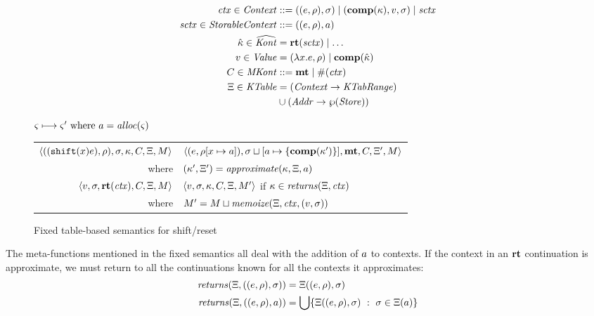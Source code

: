 \begin{align*}
  \mathit{ctx} \in \mathit{Context} &::= ((e,\rho),\sigma) \mid (\mathbf{comp}(\kappa),v,\sigma) \mid \mathit{sctx} \\
  \mathit{sctx} \in \mathit{StorableContext} &::= ((e,\rho),a) \\
  \hat{\kappa} \in \widehat{\mathit{Kont}} &= \mathbf{rt}(\mathit{sctx}) \mid \ldots \\
  v \in \mathit{Value} &= (\lambda{} x. e, \rho) \mid \mathbf{comp}(\hat{\kappa}) \\
  C \in \mathit{MKont} &::= \mathbf{mt} \mid \#(\mathit{ctx}) \\
  \Xi \in \mathit{KTable} &= (\mathit{Context} \to \mathit{KTabRange}) \\
                   &\cup (\mathit{Addr} \to \wp(\mathit{Store}))
\end{align*}

\begin{figure*}
  \centering
  $\varsigma \longmapsto \varsigma' \text{ where } a = \mathit{alloc}(\varsigma)$ \\
  \begin{tabular}{r|l}
    \hline
    $\langle ((\texttt{shift} (x) e), \rho), \sigma, \kappa, C, \Xi, M \rangle$
    &
    $\langle (e, \rho[x \mapsto a]), \sigma\sqcup[a \mapsto \{ \mathbf{comp}(\kappa') \}],\mathbf{mt},C,\Xi',M \rangle$
    \\
    where & $(\kappa',\Xi') = \mathit{approximate}(\kappa, \Xi, a)$
\\
   $\langle v, \sigma, \mathbf{rt}(\mathit{ctx}), C, \Xi, M \rangle$
   &
   $\langle v, \sigma, \kappa, C, \Xi, M' \rangle$
   if $\kappa \in \mathit{returns}(\Xi, \mathit{ctx})$
   \\
   where & $M' = M \sqcup \mathit{memoize}(\Xi, \mathit{ctx}, (v, \sigma))$
  \end{tabular}
  \caption{Fixed table-based semantics for shift/reset}
  \label{fig:shift-reset-table1}
\end{figure*}

The meta-functions mentioned in the fixed semantics all deal with the addition of $a$ to contexts.
%
If the context in an $\mathbf{rt}$ continuation is approximate, we must return to all the continuations known for all the contexts it approximates:
\begin{align*}
  \mathit{returns}(\Xi, ((e,\rho), \sigma)) &= \Xi((e,\rho), \sigma) \\
  \mathit{returns}(\Xi, ((e,\rho), a)) &=
    \bigcup\{ \Xi((e,\rho),\sigma)\ :\ \sigma \in \Xi(a)\}
\end{align*}

